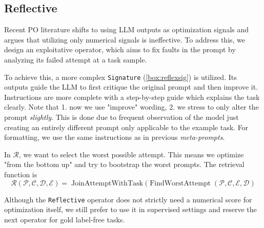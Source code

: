 \subsection{Reflective}
Recent PO literature\cite{xiang2025selfsupervisedpromptoptimization} shifts to using LLM outputs as optimization signals
and argues that utilizing only numerical signals is ineffective. To address this, we design an exploitative operator, which
aims to fix faults in the prompt by analyzing its failed attempt at a task sample. 

To achieve this, a more complex \texttt{Signature} (\ref{box:reflexsig}) is utilized. Its outputs guide the LLM to first critique the original prompt
and then improve it. Instructions are more complete with a step-by-step guide which explains the task clearly.
Note that 1. now we use "improve" wording, 2. we stress to only alter the prompt \textit{slightly}. This is done due to 
frequent observation of the model just creating an entirely different prompt only applicable to the example task.
For formatting, we use the same instructions as in previous \textit{meta-prompts}.

In $\mathcal{R}$, we want to select the worst possible attempt. This means we optimize "from the bottom up" and try to bootstrap the
worst prompts. The retrieval function is
\begin{equation}
    \mathcal{R}(\mathcal{P}, \mathcal{C}, \mathcal{D}, \mathcal{E}) = \operatorname{JoinAttemptWithTask}(\operatorname{FindWorstAttempt}(\mathcal{P}, \mathcal{C}, \mathcal{E}, \mathcal{D})
\end{equation}

Although the \texttt{Reflective} operator does not strictly need a numerical score for optimization itself,
we still prefer to use it in supervised settings and reserve the next operator for gold label-free tasks. 

